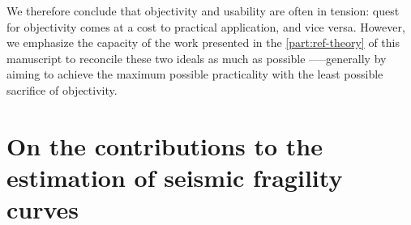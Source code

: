 We therefore conclude that objectivity and usability are often in tension: quest for objectivity comes at a cost to practical application, and vice versa. However, we emphasize the capacity of the work presented in the \cref{part:ref-theory} of this manuscript to reconcile these two ideals as much as possible —--generally by %
aiming to achieve the maximum possible practicality 
with the least possible sacrifice of objectivity.


























\section{On the contributions to the estimation of seismic fragility curves}\label{sec:concl:frags}



